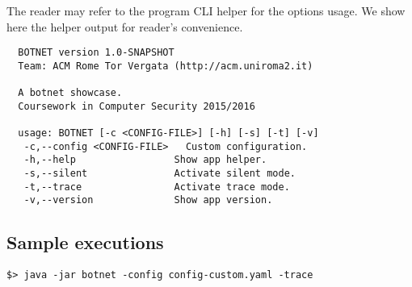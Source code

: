 The reader may refer to the program CLI helper for the options usage. We show here the helper output for reader's convenience.

\begin{verbatim}
  BOTNET version 1.0-SNAPSHOT
  Team: ACM Rome Tor Vergata (http://acm.uniroma2.it)

  A botnet showcase.
  Coursework in Computer Security 2015/2016

  usage: BOTNET [-c <CONFIG-FILE>] [-h] [-s] [-t] [-v]
   -c,--config <CONFIG-FILE>   Custom configuration.
   -h,--help                 Show app helper.
   -s,--silent               Activate silent mode.
   -t,--trace                Activate trace mode.
   -v,--version              Show app version.
\end{verbatim}

\subsection{Sample executions}
\label{sec:sample-executions}

\lipsum[1]

\begin{verbatim}
$> java -jar botnet -config config-custom.yaml -trace
\end{verbatim}

\lipsum[1]
